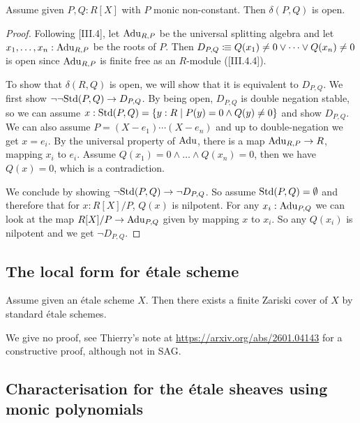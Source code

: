 \begin{lemma}\label{delta-is-open}
Assume given $P,Q:R[X]$ with $P$ monic non-constant. Then $\delta(P,Q)$ is open.
\end{lemma}

\begin{proof}
  Following \cite{lombardi-quitte}[III.4], let \(\mathrm{Adu}_{R,P}\) be the universal splitting algebra and let \(x_1,\dots,x_n:\mathrm{Adu}_{R,P}\) be the roots of \(P\).
  Then \(D_{P,Q}\vcentcolon\mspace{-1.2mu}\equiv Q(x_1)\neq 0 \vee\dots\vee Q(x_n)\neq 0\) is open since \(\mathrm{Adu}_{R,P}\) is finite free as an \(R\)-module (\cite{lombardi-quitte}[III.4.4]).
  
  To show that \(\delta(R,Q)\) is open, we will show that it is equivalent to \(D_{P,Q}\).
  We first show \(\neg\neg\mathrm{Std}(P,Q)\to D_{P,Q}\).
  By being open, \(D_{P,Q}\) is double negation stable, so we can assume \(x:\mathrm{Std}(P,Q)=\{y:R\mid P(y)=0 \wedge Q(y)\neq 0\}\) and show \(D_{P,Q}\). We can also assume \(P=(X-e_1)\cdots (X-e_n)\) and up to double-negation we get \(x=e_i\). By the universal property of \(\mathrm{Adu}\), there is a map \(\mathrm{Adu}_{R,P}\to R\), mapping \(x_i\) to \(e_i\).
  Assume \(Q(x_1)=0\wedge\dots\wedge Q(x_n)=0\), then we have \(Q(x)=0\), which is a contradiction.

  We conclude by showing \(\neg\mathrm{Std}(P,Q) \to \neg D_{P,Q}\).
  So assume \(\mathrm{Std}(P,Q)=\emptyset\) and therefore that for \(x:R[X]/P\), \(Q(x)\) is nilpotent.
  For any \(x_i:\mathrm{Adu}_{P,Q}\) we can look at the map \(R[X]/P\to \mathrm{Adu}_{P,Q}\) given by mapping \(x\) to \(x_i\). So any \(Q(x_i)\) is nilpotent and we get \(\neg D_{P,Q}\).
\end{proof}




\subsection{The local form for \'etale scheme}

\begin{theorem}\label{local-structure-etale-scheme}
Assume given an \'etale scheme $X$. Then there exists a finite Zariski cover of $X$ by standard \'etale schemes. 
\end{theorem}

We give no proof, see Thierry's note at \url{https://arxiv.org/abs/2601.04143} for a constructive proof, although not in SAG.


\subsection{Characterisation for the \'etale sheaves using monic polynomials}

